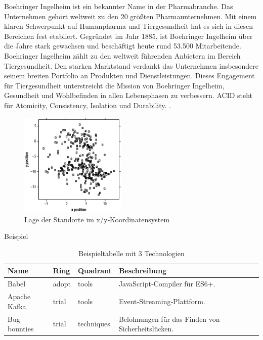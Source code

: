 Boehringer Ingelheim ist ein bekannter Name in der Pharmabranche. Das Unternehmen gehört weltweit zu den 20 größten Pharmaunternehmen. Mit einem klaren Schwerpunkt auf Humanpharma und Tiergesundheit hat es sich in diesen Bereichen fest etabliert.
Gegründet im Jahr 1885, ist Boehringer Ingelheim über die Jahre stark gewachsen und beschäftigt heute rund 53.500 Mitarbeitende.
Boehringer Ingelheim zählt zu den weltweit führenden Anbietern im Bereich Tiergesundheit. Den starken Marktstand verdankt das Unternehmen insbesondere seinem breiten Portfolio an Produkten und Dienstleistungen. Dieses Engagement für Tiergesundheit unterstreicht die Mission von Boehringer Ingelheim, Gesundheit und Wohlbefinden in allen Lebensphasen zu verbessern.
\ac{ACID} steht für Atomicity, Consistency, Isolation und Durability.
\citep{boehringerProfile2024}.
\begin{figure}[H]
    \centering
    \includegraphics[width=0.45\textwidth]{Abbildungen/01_example_image.png}
    \caption{Lage der Standorte im x/y‑Koordinatensystem}
    \label{fig:figure1}
\end{figure}
Beispiel
\begin{table}[H]
    \centering
    \begin{tabular}{|l|l|l|p{5cm}|}
        \hline
        \textbf{Name} & \textbf{Ring} & \textbf{Quadrant} & \textbf{Beschreibung}          \\
        \hline
        Babel         & adopt         & tools             & JavaScript‑Compiler für ES6+. \\
        \hline
        Apache Kafka  & trial         & tools             & Event‑Streaming‑Plattform.     \\
        \hline
        Bug bounties  & trial         & techniques        & Belohnungen für das Finden von Sicherheitslücken.     \\
        \hline
    \end{tabular}
    \caption{Beispieltabelle mit 3 Technologien}
    \label{tab:my_label}
\end{table}